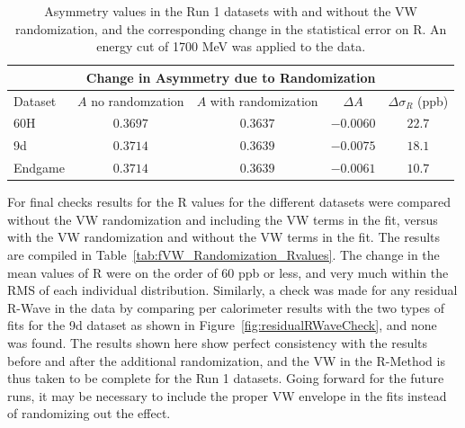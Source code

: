 \documentclass[12pt,letterpaper]{article}
\newcommand{\figref}[1]{Figure~\ref{#1}}
\begin{document}
\begin{table}[]
\centering
\small
\setlength\tabcolsep{10pt}
\renewcommand{\arraystretch}{1.2}
\begin{tabular*}{1\linewidth}{@{\extracolsep{\fill}}lcccc}
  \hline
    \multicolumn{5}{c}{\textbf{Change in Asymmetry due to Randomization}} \\
  \hline\hline
    Dataset & $A$ no randomzation & $A$ with randomization & $\Delta A$ & $\Delta \sigma_{R}$ (ppb) \\
  \hline
    60H & $0.3697$ & $0.3637$ & $-0.0060$ & $22.7$ \\
  \hline
    9d & $0.3714$ & $0.3639$ & $-0.0075$ & $18.1$ \\
  \hline
    Endgame & $0.3714$ & $0.3639$ & $-0.0061$ & $10.7$ \\
  \hline
\end{tabular*}
\caption[]{Asymmetry values in the Run 1 datasets with and without the VW randomization, and the corresponding change in the statistical error on R. An energy cut of 1700 MeV was applied to the data.}
\label{tab:A_change}
\end{table}


For final checks results for the R values for the different datasets were compared without the VW randomization and including the VW terms in the fit, versus with the VW randomization and without the VW terms in the fit. The results are compiled in Table~\ref{tab:fVW_Randomization_Rvalues}. The change in the mean values of R were on the order of 60 ppb or less, and very much within the RMS of each individual distribution. Similarly, a check was made for any residual R-Wave in the data by comparing per calorimeter results with the two types of fits for the 9d dataset as shown in \figref{fig:residualRWaveCheck}, and none was found. The results shown here show perfect consistency with the results before and after the additional randomization, and the VW in the R-Method is thus taken to be complete for the Run 1 datasets. Going forward for the future runs, it may be necessary to include the proper VW envelope in the fits instead of randomizing out the effect.
\end{document}
